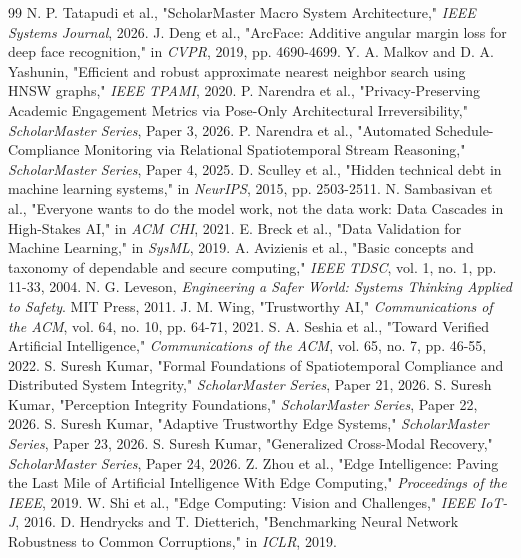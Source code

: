 \documentclass[conference]{IEEEtran}
\begin{document}
\begin{thebibliography}{99}
 N. P. Tatapudi et al., "ScholarMaster Macro System Architecture," \textit{IEEE Systems Journal}, 2026.
 J. Deng et al., "ArcFace: Additive angular margin loss for deep face recognition," in \textit{CVPR}, 2019, pp. 4690-4699.
 Y. A. Malkov and D. A. Yashunin, "Efficient and robust approximate nearest neighbor search using HNSW graphs," \textit{IEEE TPAMI}, 2020.
 P. Narendra et al., "Privacy-Preserving Academic Engagement Metrics via Pose-Only Architectural Irreversibility," \textit{ScholarMaster Series}, Paper 3, 2026.
 P. Narendra et al., "Automated Schedule-Compliance Monitoring via Relational Spatiotemporal Stream Reasoning," \textit{ScholarMaster Series}, Paper 4, 2025.
 D. Sculley et al., "Hidden technical debt in machine learning systems," in \textit{NeurIPS}, 2015, pp. 2503-2511.
 N. Sambasivan et al., "Everyone wants to do the model work, not the data work: Data Cascades in High-Stakes AI," in \textit{ACM CHI}, 2021.
 E. Breck et al., "Data Validation for Machine Learning," in \textit{SysML}, 2019.
 A. Avizienis et al., "Basic concepts and taxonomy of dependable and secure computing," \textit{IEEE TDSC}, vol. 1, no. 1, pp. 11-33, 2004.
 N. G. Leveson, \textit{Engineering a Safer World: Systems Thinking Applied to Safety}. MIT Press, 2011.
 J. M. Wing, "Trustworthy AI," \textit{Communications of the ACM}, vol. 64, no. 10, pp. 64-71, 2021.
 S. A. Seshia et al., "Toward Verified Artificial Intelligence," \textit{Communications of the ACM}, vol. 65, no. 7, pp. 46-55, 2022.
 S. Suresh Kumar, "Formal Foundations of Spatiotemporal Compliance and Distributed System Integrity," \textit{ScholarMaster Series}, Paper 21, 2026.
 S. Suresh Kumar, "Perception Integrity Foundations," \textit{ScholarMaster Series}, Paper 22, 2026.
 S. Suresh Kumar, "Adaptive Trustworthy Edge Systems," \textit{ScholarMaster Series}, Paper 23, 2026.
 S. Suresh Kumar, "Generalized Cross-Modal Recovery," \textit{ScholarMaster Series}, Paper 24, 2026.
 Z. Zhou et al., "Edge Intelligence: Paving the Last Mile of Artificial Intelligence With Edge Computing," \textit{Proceedings of the IEEE}, 2019.
 W. Shi et al., "Edge Computing: Vision and Challenges," \textit{IEEE IoT-J}, 2016.
 D. Hendrycks and T. Dietterich, "Benchmarking Neural Network Robustness to Common Corruptions," in \textit{ICLR}, 2019.

\end{thebibliography}
\end{document}
